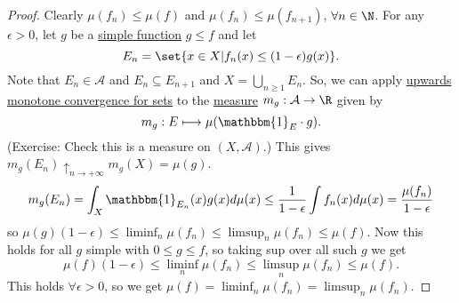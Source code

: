 \documentclass{article}
\newcommand{\1}[1]{\mathbbm{1}_{#1}}
\begin{document}


\begin{proof}
    Clearly $\mu(f_n) \leq \mu(f)$ and $\mu(f_n) \leq \mu(f_{n+1})$, $\forall n \in \N$.
    For any $\epsilon>0$, let $g$ be a \hyperlink{def:simpleFunc}{simple function} $g \leq f$ and let
    \begin{equation*}
        E_n = \set{x \in X | f_n(x) \leq (1 - \epsilon) g(x)}.
    \end{equation*}
    Note that $E_n \in \mathcal{A}$ and $E_n \subseteq E_{n+1}$ and $X =  \bigcup_{n \geq 1} E_n$.
    So, we can apply \hyperlink{prop:monotoneConvForSets}{upwards monotone convergence for sets} to the \hyperlink{def:measure}{measure} $m_g: \mathcal{A} \to \R$ given by
    \begin{equation*}
        m_g: E \longmapsto \mu(\1{E} \cdot g).
    \end{equation*}
    (Exercise: Check this is a measure on $(X, \mathcal{A})$.)
    This gives $m_g(E_n) \uparrow_{n \to +\infty} m_g(X) = \mu(g)$.
    \begin{equation*}
        m_g(E_n) = \int_X \1{E_n}(x) g(x) d \mu(x) \leq \frac{1}{1-\epsilon} \int f_n(x) d\mu(x) = \frac{\mu(f_n)}{1-\epsilon}
    \end{equation*}
    so $\mu(g) (1-\epsilon) \leq \liminf_n \mu(f_n) \leq \limsup_n \mu(f_n) \leq \mu(f)$.
    Now this holds for all $g$ simple with $0 \leq g \leq f$, so taking sup over all such $g$ we get
    \begin{equation*}
        \mu(f) (1-\epsilon) \leq \liminf_n \mu(f_n) \leq \limsup_n \mu(f_n) \leq \mu(f).
    \end{equation*}
    This holds $\forall \epsilon > 0$, so we get $\mu(f) = \liminf_n \mu(f_n) = \limsup_n \mu(f_n)$.
\end{proof}
\end{document}
